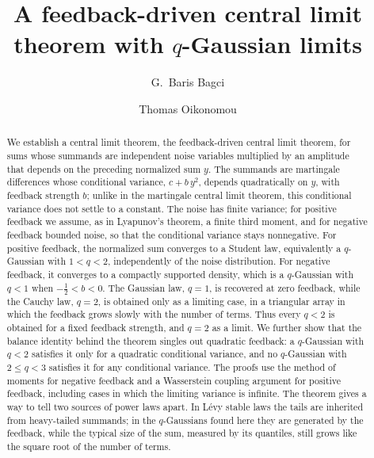 \documentclass[aip,jmp,preprint,onecolumn,floatfix,superscriptaddress,nofootinbib,11pt]{revtex4-2}
\theoremstyle{plain}
\theoremstyle{remark}
\numberwithin{equation}{section}
\begin{document}
 
\title{A feedback-driven central limit theorem with $q$-Gaussian limits}
 
\author{G.~Baris Bagci}
\author{Thomas Oikonomou}
 
\begin{abstract}
We establish a central limit theorem, the feedback-driven central limit theorem, for sums whose summands are independent noise variables multiplied by an amplitude that depends on the preceding normalized sum $y$. The summands are martingale differences whose conditional variance, $c+b\,y^{2}$, depends quadratically on $y$, with feedback strength $b$; unlike in the martingale central limit theorem, this conditional variance does not settle to a constant. The noise has finite variance; for positive feedback we assume, as in Lyapunov's theorem, a finite third moment, and for negative feedback bounded noise, so that the conditional variance stays nonnegative. For positive feedback, the normalized sum converges to a Student law, equivalently a $q$-Gaussian with $1<q<2$, independently of the noise distribution. For negative feedback, it converges to a compactly supported density, which is a $q$-Gaussian with $q<1$ when $-\tfrac12<b<0$. The Gaussian law, $q=1$, is recovered at zero feedback, while the Cauchy law, $q=2$, is obtained only as a limiting case, in a triangular array in which the feedback grows slowly with the number of terms. Thus every $q<2$ is obtained for a fixed feedback strength, and $q=2$ as a limit. We further show that the balance identity behind the theorem singles out quadratic feedback: a $q$-Gaussian with $q<2$ satisfies it only for a quadratic conditional variance, and no $q$-Gaussian with $2\le q<3$ satisfies it for any conditional variance. The proofs use the method of moments for negative feedback and a Wasserstein coupling argument for positive feedback, including cases in which the limiting variance is infinite. The theorem gives a way to tell two sources of power laws apart. In L\'evy stable laws the tails are inherited from heavy-tailed summands; in the $q$-Gaussians found here they are generated by the feedback, while the typical size of the sum, measured by its quantiles, still grows like the square root of the number of terms.
\end{abstract}
 
\end{document}
